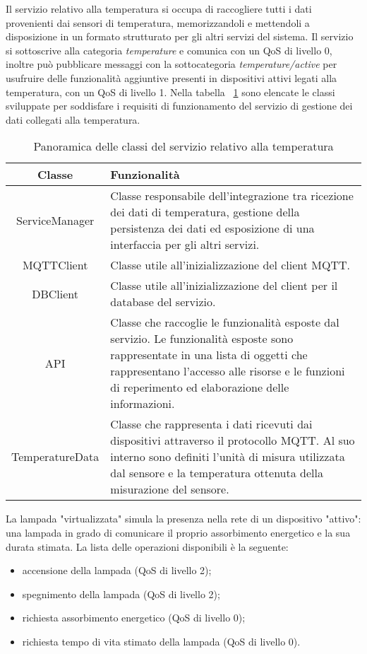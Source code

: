
Il servizio relativo alla temperatura si occupa di raccogliere tutti i dati provenienti dai sensori di temperatura, memorizzandoli e mettendoli a disposizione in un formato strutturato per gli altri servizi del sistema.
Il servizio si sottoscrive alla categoria \emph{temperature} e comunica con un QoS di livello 0, inoltre può pubblicare messaggi con la sottocategoria \emph{temperature/active} per usufruire delle funzionalità aggiuntive presenti in dispositivi attivi legati alla temperatura, con un QoS di livello 1.
Nella tabella ~\ref{tab:classi-temperatura} sono elencate le classi sviluppate per soddisfare i requisiti di funzionamento del servizio di gestione dei dati collegati alla temperatura.


\begin{table}[!h]
\caption{Panoramica delle classi del servizio relativo alla temperatura}
\label{tab:classi-temperatura}
\begin{tabularx}{\linewidth}{|c|X|}
\hline
\textbf{Classe} & \textbf{Funzionalità} \\
\hline
ServiceManager & Classe responsabile dell'integrazione tra ricezione dei dati di temperatura, gestione della persistenza dei dati ed esposizione di una interfaccia per gli altri servizi. \\
\hline
MQTTClient & Classe utile all'inizializzazione del client MQTT. \\
\hline
DBClient & Classe utile all'inizializzazione del client per il database del servizio. \\
\hline
API & Classe che raccoglie le funzionalità esposte dal servizio. Le funzionalità esposte sono rappresentate in una lista di oggetti che rappresentano l'accesso alle risorse e le funzioni di reperimento ed elaborazione delle informazioni. \\
\hline
TemperatureData & Classe che rappresenta i dati ricevuti dai dispositivi attraverso il protocollo MQTT. Al suo interno sono definiti l'unità di misura utilizzata dal sensore e la temperatura ottenuta della misurazione del sensore. \\
\hline
\end{tabularx}
\end{table}


La lampada "virtualizzata" simula la presenza nella rete di un dispositivo "attivo": una lampada in grado di comunicare il proprio assorbimento energetico e la sua durata stimata.
La lista delle operazioni disponibili è la seguente:
\begin{itemize}
	\item accensione della lampada (QoS di livello 2);
	\item spegnimento della lampada (QoS di livello 2);
	\item richiesta assorbimento energetico (QoS di livello 0);
	\item richiesta tempo di vita stimato della lampada (QoS di livello 0).
\end{itemize}

